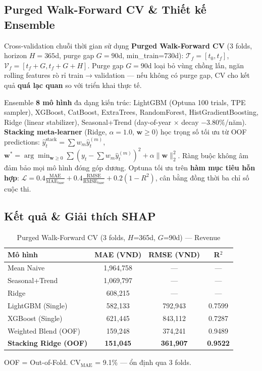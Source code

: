 \documentclass{article}
\begin{document}
\subsection{Purged Walk-Forward CV \& Thiết kế Ensemble}

Cross-validation chuỗi thời gian sử dụng \textbf{Purged Walk-Forward CV} (3 folds, horizon $H=365$d, purge gap $G=90$d, min\_train=730d): $\mathcal{T}_f = [t_0, t_f]$, $\mathcal{V}_f = [t_f+G, t_f+G+H]$. Purge gap $G=90$d loại bỏ vùng chồng lấn, ngăn rolling features rò rỉ train$\to$validation --- nếu không có purge gap, CV cho kết quả \textbf{quá lạc quan} so với triển khai thực tế.

Ensemble \textbf{8 mô hình} đa dạng kiến trúc: LightGBM (Optuna 100 trials, TPE sampler), XGBoost, CatBoost, ExtraTrees, RandomForest, HistGradientBoosting, Ridge (linear stabilizer), Seasonal+Trend (day-of-year $\times$ decay $-3.80\%$/năm). \textbf{Stacking meta-learner} (Ridge, $\alpha=1.0$, $\mathbf{w} \ge 0$) học trọng số tối ưu từ OOF predictions: $\hat{y}_t^{\text{stack}} = \sum w_m \hat{y}_t^{(m)}$, $\mathbf{w}^* = \arg\min_{\mathbf{w} \ge 0} \sum (y_t - \sum w_m \hat{y}_t^{(m)})^2 + \alpha\|\mathbf{w}\|_2^2$. Ràng buộc không âm đảm bảo mọi mô hình đóng góp dương. Optuna tối ưu trên \textbf{hàm mục tiêu hỗn hợp}: $\mathcal{L} = 0.4\frac{\text{MAE}}{\text{MAE}_\text{base}} + 0.4\frac{\text{RMSE}}{\text{RMSE}_\text{base}} + 0.2(1-R^2)$, cân bằng đồng thời ba chỉ số cuộc thi.

\subsection{Kết quả \& Giải thích SHAP}

\begin{table}[H]
    \centering
    \small
    \caption{Purged Walk-Forward CV (3 folds, $H$=365d, $G$=90d) --- Revenue}
    \label{tab:results}
    \begin{tabular}{@{}lccc@{}}
        \toprule
        \textbf{Mô hình} & \textbf{MAE (VND)} & \textbf{RMSE (VND)} & \textbf{R$^2$} \\
        \midrule
        Mean Naive           & 1,964,758 & ---      & --- \\
        Seasonal+Trend       & 1,069,797 & ---      & --- \\
        Ridge                &   608,215 & ---      & --- \\
        LightGBM (Single)    &   582,133 &   792,943 & 0.7599 \\
        XGBoost (Single)     &   621,445 &   843,112 & 0.7287 \\
        \midrule
        Weighted Blend (OOF) &   159,248 &   374,241 & 0.9489 \\
        \textbf{Stacking Ridge (OOF)} & \textbf{151,045} & \textbf{361,907} & \textbf{0.9522} \\
        \bottomrule
    \end{tabular}
    
    {\footnotesize OOF = Out-of-Fold. CV$_\text{MAE}$ = 9.1\% --- ổn định qua 3 folds.}
\end{table}
\end{document}
